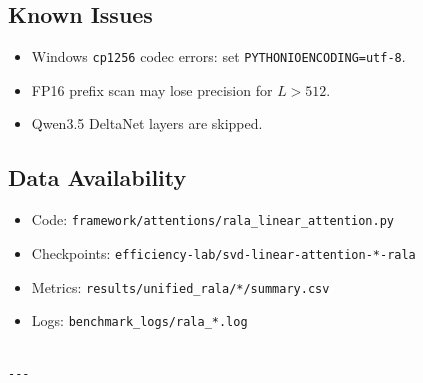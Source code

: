 \subsection{Known Issues}

\begin{itemize}
\item Windows \texttt{cp1256} codec errors: set \texttt{PYTHONIOENCODING=utf-8}.
\item FP16 prefix scan may lose precision for $L > 512$.
\item Qwen3.5 DeltaNet layers are skipped.

\end{itemize}
\subsection{Data Availability}

\begin{itemize}
\item Code: \texttt{framework/attentions/rala\_linear\_attention.py}
\item Checkpoints: \texttt{efficiency-lab/svd-linear-attention-*-rala}
\item Metrics: \texttt{results/unified\_rala/*/summary.csv}
\item Logs: \texttt{benchmark\_logs/rala\_*.log}
\end{itemize}
\begin{lstlisting}

---
\end{lstlisting}